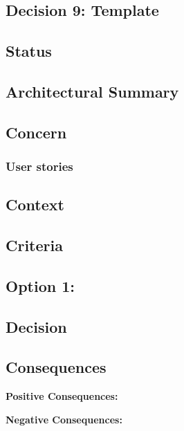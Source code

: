 \subsection{Decision 9: Template}

\subsection*{Status}

\subsection*{Architectural Summary}


\subsection*{Concern}
\subsubsection*{User stories}

\subsection*{Context}

\subsection*{Criteria}
\begin{itemize}
\end{itemize}

\subsection*{Option 1: }

\subsection*{Decision}

\subsection*{Consequences}
\textbf{Positive Consequences:}
\begin{itemize}
\end{itemize}
\textbf{Negative Consequences:}
\begin{itemize}
\end{itemize}